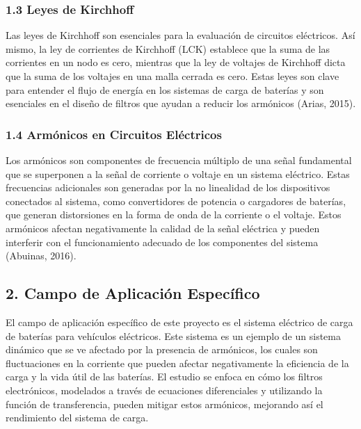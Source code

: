 \subsubsection{1.3 Leyes de Kirchhoff}
Las leyes de Kirchhoff son esenciales para la evaluaci\'on de circuitos el\'ectricos. As\'i mismo, la ley de corrientes de Kirchhoff (LCK) establece que la suma de las corrientes en un nodo es cero, mientras que la ley de voltajes de Kirchhoff dicta que la suma de los voltajes en una malla cerrada es cero. Estas leyes son clave para entender el flujo de energ\'ia en los sistemas de carga de bater\'ias y son esenciales en el dise\~no de filtros que ayudan a reducir los arm\'onicos (Arias, 2015).

\subsubsection{1.4 Arm\'onicos en Circuitos El\'ectricos}
Los arm\'onicos son componentes de frecuencia m\'ultiplo de una se\~nal fundamental que se superponen a la se\~nal de corriente o voltaje en un sistema el\'ectrico. Estas frecuencias adicionales son generadas por la no linealidad de los dispositivos conectados al sistema, como convertidores de potencia o cargadores de bater\'ias, que generan distorsiones en la forma de onda de la corriente o el voltaje. Estos arm\'onicos afectan negativamente la calidad de la se\~nal el\'ectrica y pueden interferir con el funcionamiento adecuado de los componentes del sistema (Abuinas, 2016).

\subsection{2. Campo de Aplicaci\'on Espec\'ifico}
El campo de aplicaci\'on espec\'ifico de este proyecto es el sistema el\'ectrico de carga de bater\'ias para veh\'iculos el\'ectricos. Este sistema es un ejemplo de un sistema din\'amico que se ve afectado por la presencia de arm\'onicos, los cuales son fluctuaciones en la corriente que pueden afectar negativamente la eficiencia de la carga y la vida \'util de las bater\'ias. El estudio se enfoca en c\'omo los filtros electr\'onicos, modelados a trav\'es de ecuaciones diferenciales y utilizando la funci\'on de transferencia, pueden mitigar estos arm\'onicos, mejorando as\'i el rendimiento del sistema de carga.

